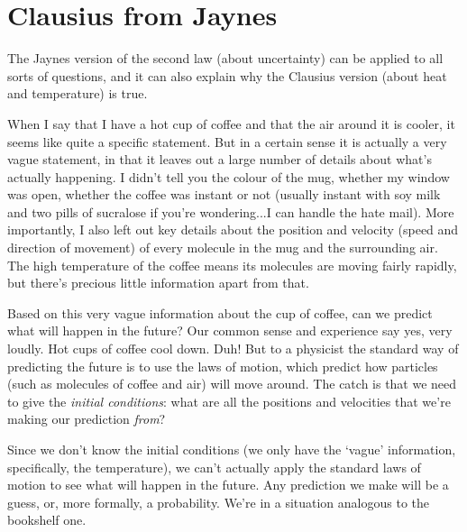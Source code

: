 \documentclass[a4paper, 12pt]{article}
\begin{document}

\section*{Clausius from Jaynes}
The Jaynes version of the second law (about uncertainty)
can be applied to all sorts of
questions, and it can also explain why the Clausius version (about heat and
temperature) is true. 

When I say that I have a hot cup of coffee and that the air around it is cooler,
it seems like quite a specific statement. But in a certain sense it is actually
a very vague statement, in that it leaves out a large number of details about
what's actually happening. I didn't tell you the colour of the mug, whether
my window was open, whether the coffee was instant or not (usually instant with
soy milk and two pills of sucralose if you're wondering...I can handle the hate mail). More importantly, I also left out key details about the position and
velocity (speed and direction of movement) of every molecule in the mug and
the surrounding air. The high temperature of the coffee means its
molecules are moving fairly rapidly, but there's precious little information
apart from that.

Based on this very vague information about the cup of coffee, can we predict
what will happen in the future? Our common sense and experience say yes, very
loudly. Hot cups of coffee cool down. Duh!
But to a physicist the standard way of predicting the future is to use
the laws of motion, which predict how particles (such as molecules of coffee
and air) will move around. The catch is that we need to give the {\it initial
conditions}: what are all the positions and velocities that we're making our
prediction {\it from}?

Since we don't know the initial conditions (we only have the `vague' information, specifically, the temperature), we can't actually apply the standard laws of motion to
see what will happen in the future. Any prediction we make will be a
guess, or, more formally, a probability. We're in a situation analogous to the
bookshelf one. 
\end{document}
